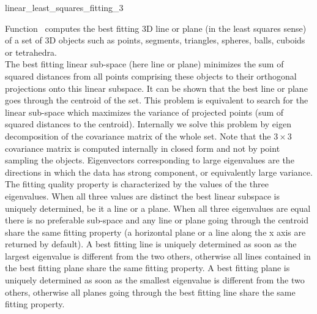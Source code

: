 
\begin{ccRefFunction}{linear_least_squares_fitting_3}  

\ccDefinition
  
Function \ccRefName\ computes the best fitting 3D line or plane (in the least squares sense) of a set of 3D objects such as points, segments, triangles, spheres, balls, cuboids or tetrahedra. \\

The best fitting linear sub-space (here line or plane) minimizes the sum of squared distances from all points comprising these objects to their orthogonal projections onto this linear subspace. It can be shown that the best line or plane goes through the centroid of the set. This problem is equivalent to search for the linear sub-space which maximizes the variance of projected points (sum of squared distances to the centroid). Internally we solve this problem by eigen decomposition of the covariance matrix of the whole set. Note that the $3 \times 3$ covariance matrix is computed internally in closed form and not by point sampling the objects. Eigenvectors corresponding to large eigenvalues are the directions in which the data has strong component, or equivalently large variance.\\

The fitting quality property is characterized by the values of the three eigenvalues. When all three values are distinct the best linear subspace is uniquely determined, be it a line or a plane. When all three eigenvalues are equal there is no preferable sub-space and any line or plane going through the centroid share the same fitting property (a horizontal plane or a line along the x axis are returned by default). A best fitting line is uniquely determined as soon as the largest eigenvalue is different from the two others, otherwise all lines contained in the best fitting plane share the same fitting property. A best fitting plane is uniquely determined as soon as the smallest eigenvalue is different from the two others, otherwise all planes going through the best fitting line share the same fitting property.


\end{ccRefFunction}
